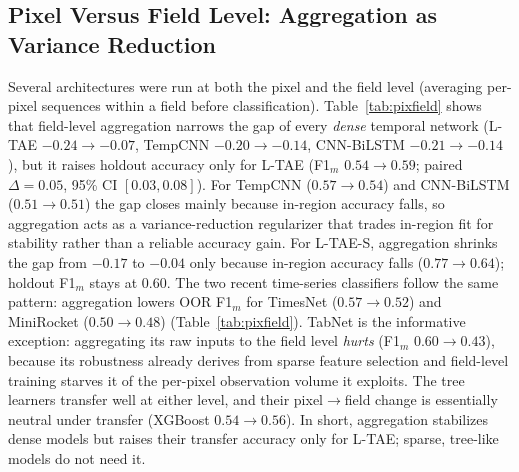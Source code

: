 \documentclass[preprint,authoryear]{elsarticle}
\begin{document}
\subsection{Pixel Versus Field Level: Aggregation as Variance Reduction}
\label{sec:pixfield}
Several architectures were run at both the pixel and the field level (averaging per-pixel sequences within a field before classification). Table~\ref{tab:pixfield} shows that field-level aggregation narrows the gap of every \emph{dense} temporal network (L-TAE $-0.24\rightarrow-0.07$, TempCNN $-0.20\rightarrow-0.14$, CNN-BiLSTM $-0.21\rightarrow-0.14$), but it raises holdout accuracy only for L-TAE (F1$_m$ $0.54\rightarrow0.59$; paired $\Delta=0.05$, 95\% CI $[0.03,0.08]$). For TempCNN ($0.57\rightarrow0.54$) and CNN-BiLSTM ($0.51\rightarrow0.51$) the gap closes mainly because in-region accuracy falls, so aggregation acts as a variance-reduction regularizer that trades in-region fit for stability rather than a reliable accuracy gain. For L-TAE-S, aggregation shrinks the gap from $-0.17$ to $-0.04$ only because in-region accuracy falls ($0.77\rightarrow0.64$); holdout F1$_m$ stays at $0.60$. The two recent time-series classifiers follow the same pattern: aggregation lowers OOR F1$_m$ for TimesNet ($0.57\rightarrow0.52$) and MiniRocket ($0.50\rightarrow0.48$) (Table~\ref{tab:pixfield}). TabNet is the informative exception: aggregating its raw inputs to the field level \emph{hurts} (F1$_m$ $0.60\rightarrow0.43$), because its robustness already derives from sparse feature selection and field-level training starves it of the per-pixel observation volume it exploits. The tree learners transfer well at either level, and their pixel$\rightarrow$field change is essentially neutral under transfer (XGBoost $0.54\rightarrow0.56$). In short, aggregation stabilizes dense models but raises their transfer accuracy only for L-TAE; sparse, tree-like models do not need it.
\end{document}
